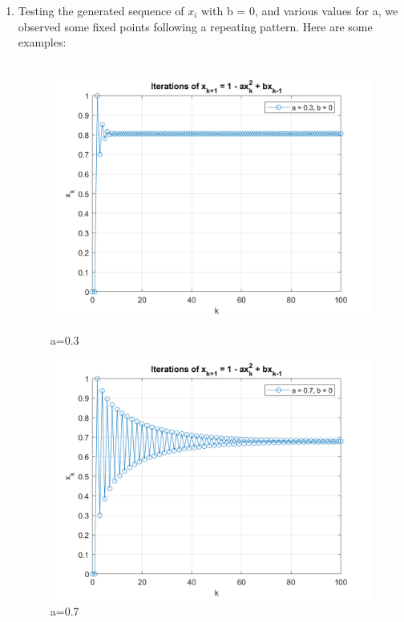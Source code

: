 \documentclass{article}
\begin{document}
\begin{enumerate} [label=\Alph*]
  \item Testing the generated sequence of $x_i$ with b = 0, and various values for a, we observed some fixed points following a repeating pattern. Here are some examples: 
    \\ \\

    \begin{figure}[h]
      \centering
      \begin{minipage}[t]{0.5\textwidth}
        \centering
        \includegraphics[width=0.8\linewidth]{Problem3_a0.3.png}
        \caption{a=0.3}
        \label{fig:img1}
      \end{minipage}%
      \begin{minipage}[t]{0.5\textwidth}
        \centering
        \includegraphics[width=0.8\linewidth]{Problem3_a0.7.png}
        \caption{a=0.7}
        \label{fig:img2}
      \end{minipage}
    \end{figure}


\end{enumerate}
\end{document}
